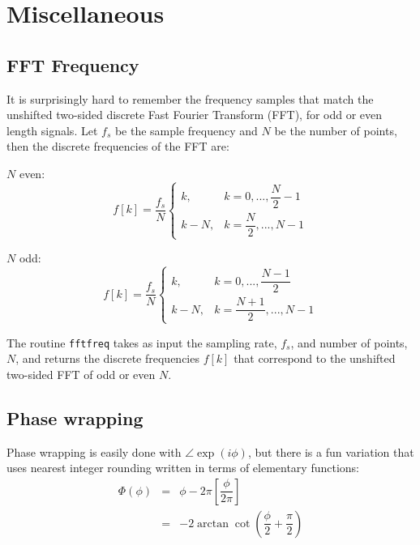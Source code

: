 

\section{Miscellaneous}

\subsection{FFT Frequency}

It is surprisingly hard to remember the frequency samples that match the unshifted two-sided discrete Fast Fourier Transform (FFT), for odd or even length signals. Let $f_s$ be the sample frequency and $N$ be the number of points, then the discrete frequencies of the FFT are:

$N$ even:
\begin{equation}
f[k] = \dfrac{f_s}{N}\begin{cases}
    k,& k = 0,..., \dfrac{N}{2} - 1\\
    k-N, & k = \dfrac{N}{2}, ..., N-1 
\end{cases}
\end{equation}

$N$ odd:
\begin{equation}
f[k] = \dfrac{f_s}{N}\begin{cases}
    k,& k = 0,..., \dfrac{N-1}{2} \\
    k-N, & k = \dfrac{N+1}{2}, ..., N-1 
\end{cases}
\end{equation}

The routine \texttt{fftfreq} takes as input the sampling rate, $f_s$, and number of points, $N$, and returns the discrete frequencies $f[k]$ that correspond to the unshifted two-sided FFT of odd or even $N$.

{\footnotesize
{}
}



\subsection{Phase wrapping}

Phase wrapping is easily done with $\angle \exp(i\phi)$, but there is a fun variation that uses nearest integer rounding written in terms of elementary functions: 
\begin{eqnarray}
\Phi(\phi) & = & \phi - 2\pi\left[\dfrac{\phi}{2\pi} \right] \\
\ & = & -2\arctan\cot\left(\dfrac{\phi}{2} + \dfrac{\pi}{2}\right) 
\end{eqnarray} 


